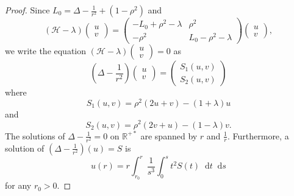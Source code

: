 \documentclass[11 pt]{amsart}
\theoremstyle{definition}
\theoremstyle{remark}
\numberwithin{equation}{section}
\newcommand{\dd}{\mathop{}\!\mathrm{d}}
\begin{document}
\begin{proof}
  Since $L_0 = \Delta - \frac{1}{r^2} + (1 - \rho^2)$ and
  \[ (\mathcal{H}- \lambda) \left(\begin{array}{c}
       u\\
       v
     \end{array}\right) = \left(\begin{array}{cc}
       - L_0 + \rho^2 - \lambda & \rho^2\\
       - \rho^2 & L_0 - \rho^2 - \lambda
     \end{array}\right) \left(\begin{array}{c}
       u\\
       v
     \end{array}\right), \]
  we write the equation $(\mathcal{H}- \lambda) \left(\begin{array}{c}
    u\\
    v
  \end{array}\right) = 0$ as
  \[ \left( \Delta - \frac{1}{r^2} \right) \left(\begin{array}{c}
       u\\
       v
     \end{array}\right) = \left(\begin{array}{c}
       S_1 (u, v)\\
       S_2 (u, v)
     \end{array}\right) \]
  where
  \[ S_1 (u, v) = \rho^2 (2 u + v) - (1 + \lambda) u \]
  and
  \[ S_2 (u, v) = \rho^2 (2 v + u) - (1 - \lambda) v. \]
  The solutions of $\Delta - \frac{1}{r^2} = 0$ on $\mathbb{R}^{+ \ast}$ are spanned by $r$ and $\frac{1}{r}$. Furthermore, a solution of $\left( \Delta -
  \frac{1}{r^2} \right) (u) = S$ is
  \[ u (r) = r \int_{r_0}^r \frac{1}{s^3} \int_0^s t^2 S (t) \dd t \dd s \]
  for any $r_0 > 0$.


\end{proof}
\end{document}
